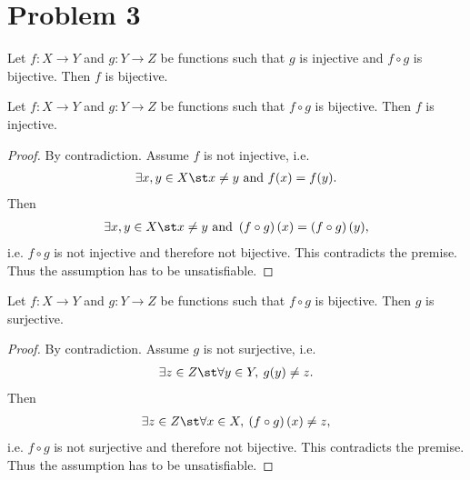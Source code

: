 \documentclass{article}
\begin{document}
\section*{Problem 3}
\begin{claim}
  Let $f:X\to Y$ and $g:Y\to Z$ be functions such that $g$ is injective and $f\circ g$ is bijective. Then $f$ is bijective.
\end{claim}
\begin{adjustwidth}{2em}{0pt}
  \begin{lemma}
    \label{l1}
    Let $f:X\to Y$ and $g:Y\to Z$ be functions such that $f\circ g$ is bijective. Then $f$ is injective.
  \end{lemma}
  \begin{proof}
    By contradiction. Assume $f$ is not injective, i.e.
    \begin{align*}
      \exists x,y \in X \st x \not= y \text{ and } f(x) = f(y).
    \end{align*}
    Then
    \begin{align*}
      \exists x,y \in X \st x \not= y \text{ and } \left(f\circ g\right)(x) = \left(f\circ g\right)(y),
    \end{align*}
    i.e. $f\circ g$ is not injective and therefore not bijective.
    This contradicts the premise.
    Thus the assumption has to be unsatisfiable.
  \end{proof}
  \begin{lemma}
    \label{l2}
    Let $f:X\to Y$ and $g:Y\to Z$ be functions such that $f\circ g$ is bijective. Then $g$ is surjective.
  \end{lemma}
  \begin{proof}
    By contradiction. Assume $g$ is not surjective, i.e.
    \begin{align*}
      \exists z \in Z \st \forall y \in Y,\:g(y) \not= z.
    \end{align*}
    Then
    \begin{align*}
      \exists z \in Z \st \forall x \in X,\: \left(f\circ g\right)(x) \not= z,
    \end{align*}
    i.e. $f\circ g$ is not surjective and therefore not bijective.
    This contradicts the premise.
    Thus the assumption has to be unsatisfiable.
  \end{proof}
\end{adjustwidth}
\end{document}
